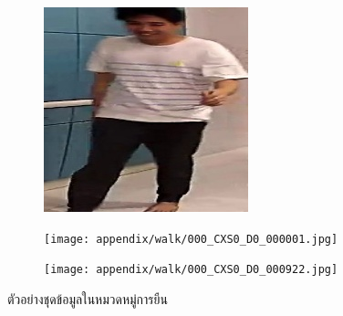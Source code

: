 \begin{figure}[!ht]
\begin{subfigure}[b]{0.45\linewidth}
    \end{subfigure}
    \begin{subfigure}[b]{0.45\linewidth}
      \includegraphics[width=\linewidth]{appendix/walk/000_CXS0_D0_000542.jpg}
    \end{subfigure}
    \begin{subfigure}[b]{0.45\linewidth}
      \texttt{[image: appendix/walk/000\_CXS0\_D0\_000001.jpg]}
    \end{subfigure}
    \begin{subfigure}[b]{0.45\linewidth}
      \texttt{[image: appendix/walk/000\_CXS0\_D0\_000922.jpg]}
    \end{subfigure}
    \caption{ตัวอย่างชุดข้อมูลในหมวดหมู่การยืน}
    \label{fig:result_track}
 \end{figure}

